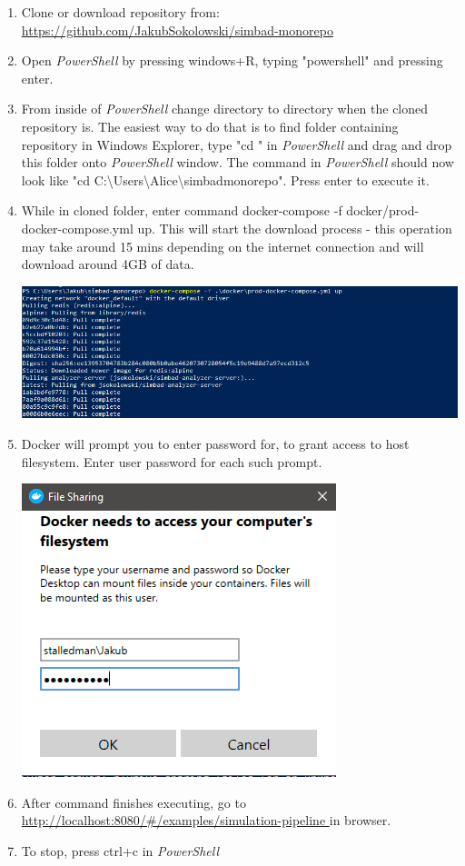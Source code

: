 \begin{enumerate}
\begin{minipage}{\linewidth}
        \end{minipage}
    \item Clone or download repository from: \newline
     \url{https://github.com/JakubSokolowski/simbad-monorepo}
    \item Open \textit{PowerShell} by pressing windows+R, typing "powershell" and pressing enter.
    \item From inside of  \textit{PowerShell} change directory to directory when the cloned repository is. The easiest way to do that is to find folder containing repository in Windows Explorer, type "cd " in  \textit{PowerShell} and drag and drop this folder onto  \textit{PowerShell} window. The command in  \textit{PowerShell} should now look like "cd C:\textbackslash Users\textbackslash Alice\textbackslash simbad\-monorepo". Press enter to execute it.
    \item While in cloned folder, enter command docker-compose -f docker/prod-docker-compose.yml up. This will start the download process - this operation may take around 15 mins depending on the internet connection and will download around 4GB of data. \newline
        \begin{minipage}{\linewidth}
            \centering
        	\includegraphics[width=0.9\linewidth]{instructions/docker2.PNG}
        \end{minipage}
    \item Docker will prompt you to enter password for, to grant access to host filesystem. Enter user password for each such prompt. \newline
    \begin{minipage}{\linewidth}
        \centering
        \includegraphics[width=0.5\linewidth]{instructions/docker3.PNG}
    \end{minipage}
    \item After command finishes executing, go to \url{http://localhost:8080/\#/examples/simulation-pipeline } in browser.
    \item To stop, press ctrl+c in \textit{PowerShell}
\end{enumerate}
